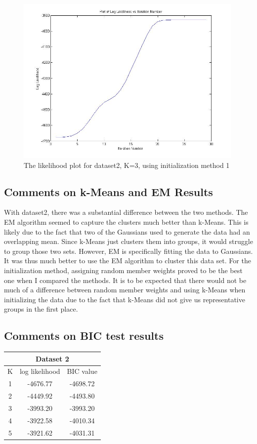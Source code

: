 \documentclass[11pt,psfig]{article}
\begin{document}
\begin{figure}[H]
\centering
\includegraphics[height=3.25in]{dataset2_EMlogLikelihoodPlot.jpg}
\caption{The likelihood plot for dataset2, K=3, using initialization method 1}
\end{figure}

\subsection{Comments on k-Means and EM Results}

With dataset2, there was a substantial difference between the two methods. The EM algorithm seemed to capture the clusters much better than k-Means. This is likely due to the fact that two of the Gaussians used to generate the data had an overlapping mean. Since k-Means just clusters them into groups, it would struggle to group those two sets. However, EM is specifically fitting the data to Gaussians. It was thus much better to use the EM algorithm to cluster this data set. For the initialization method, assigning random member weights proved to be the best one when I compared the methods. It is to be expected that there would not be much of a difference between random member weights and using k-Means when initializing the data due to the fact that k-Means did not give us representative groups in the first place. 

\subsection{Comments on BIC test results}

\begin{table}[H]
  \centering
  \begin{tabular}{|c|c|c|}
    \hline
    \multicolumn{3}{|c|}{Dataset 2} \\\hline
    K & log likelihood & BIC value \\\hline
    1 & -4676.77 & -4698.72 \\
		2 & -4449.92 & -4493.80 \\
		3 & -3993.20 & -3993.20 \\
		4 & -3922.58 & -4010.34 \\
    5 & -3921.62 & -4031.31 \\\hline
  \end{tabular}
\end{table}
\end{document}
